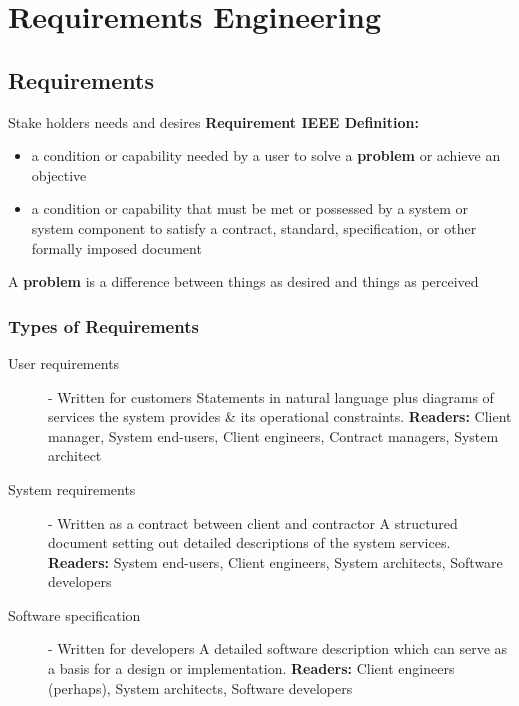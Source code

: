 \documentclass{report}
\begin{document}
\newpage
\chapter{Requirements Engineering}
\section{Requirements}
\noindent Stake holders needs and desires\newline
\textbf{Requirement IEEE Definition:}
  \begin{itemize}
    \item a condition or capability needed by a user to solve a \textbf{problem} or achieve an objective
    \item a condition or capability that must be met or possessed by a system or system component to satisfy a contract, standard, specification, or other formally imposed document
  \end{itemize}
A \textbf{problem} is a difference between things as desired and things as perceived

\subsection{Types of Requirements}
\begin{description}
  \item [User requirements] - Written for customers\newline
  Statements in natural language plus diagrams of services the system provides \& its operational constraints.\newline
  \textbf{Readers:} Client manager, System end-users, Client engineers, Contract managers, System architect
  \item [System requirements] - Written as a contract between client and contractor \newline
  A structured document setting out detailed descriptions of the system services.\newline
  \textbf{Readers:} System end-users, Client engineers, System architects, Software developers
  \item [Software specification] - Written for developers \newline
  A detailed software description which can serve as a basis for a design or implementation. \newline
  \textbf{Readers:} Client engineers (perhaps), System architects, Software developers
\end{description}
\end{document}
